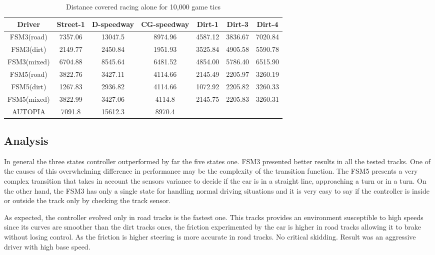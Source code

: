 	\begin{table}[h]
	\renewcommand{\arraystretch}{1.3}
	\caption{Distance covered racing alone for 10,000 game tics}
	\label{tbl:dist covered}
	\centering
	\begin{tabular}{c||c||c||c||c||c||c}
	\hline
	\bfseries Driver & \bfseries Street-1 & \bfseries D-speedway & \bfseries CG-speedway & \bfseries Dirt-1 & \bfseries Dirt-3 & \bfseries Dirt-4 \\ 
	\hline
	\hline FSM3(road) & 7357.06	& 13047.5 & 8974.96 & 4587.12 & 3836.67 & 7020.84 \\
	\hline FSM3(dirt) & 2149.77	& 2450.84 & 1951.93	& 3525.84 & 4905.58 & 5590.78 \\
	\hline FSM3(mixed) & 6704.88 & 8545.64 & 6481.52 & 4854.00 & 5786.40 & 6515.90 \\
	\hline FSM5(road) & 3822.76 & 3427.11 & 4114.66	& 2145.49 &	2205.97 & 3260.19 \\
	\hline FSM5(dirt) & 1267.83 & 2936.82 &	4114.66 & 1072.92 &	2205.82 & 3260.33 \\
	\hline FSM5(mixed) & 3822.99 & 3427.06 & 4114.8 & 2145.75 &	2205.83 & 3260.31 \\
	\hline AUTOPIA & 7091.8 & 15612.3 & 8970.4 & \toDo{?} &\toDo{?} &\toDo{?} \\
	\hline 
	\end{tabular} 
	\end{table}
	
	
\subsection{Analysis} \label{subsec:Analysis}
	
	In general the three states controller outperformed by far the five states one. FSM3 presented better results in all the tested tracks. One of the causes of this overwhelming difference in performance may be the complexity of the transition function. The FSM5 presents a very complex transition that takes in account the sensors variance to decide if the car is in a straight line, approaching a turn or in a turn. On the other hand, the FSM3 has only a single state for handling normal driving situations and it is very easy to say if the controller is inside or outside the track only by checking the track sensor.
	
	As expected, the controller evolved only in road tracks is the fastest one. This tracks provides an environment susceptible to high speeds since its curves are smoother than the dirt tracks ones, the friction experimented by the car is higher in road tracks allowing it to brake without losing control. As the friction is higher steering is more accurate in road tracks. No critical skidding. Result was an aggressive driver with high base speed.
	
